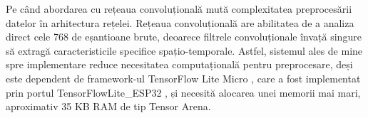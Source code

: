 	
	Pe când abordarea cu rețeaua convoluțională mută complexitatea preprocesării datelor în arhitectura rețelei. Rețeaua convoluțională are abilitatea de a analiza direct cele 768 de eșantioane brute, deoarece filtrele convoluționale învață singure să extragă caracteristicile specifice spațio-temporale. Astfel, sistemul ales de mine spre implementare reduce necesitatea computațională pentru preprocesare, deși este dependent de framework-ul TensorFlow Lite Micro \cite{tensorflow:tflitemicro_github}, care a fost implementat prin portul TensorFlowLite\_ESP32 \cite{tanaka2026tflite_esp32}, și necesită alocarea unei memorii mai mari, aproximativ 35 KB RAM de tip Tensor Arena. \cite{tensorflow:tflitemicro_github}
	
	